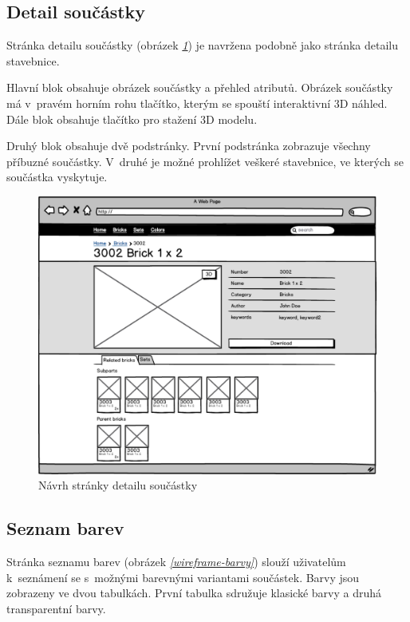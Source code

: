 \subsection{Detail součástky}
Stránka detailu součástky (obrázek \emph{\ref{wireframe-soucastka-detail}}) je navržena podobně jako stránka detailu stavebnice. 

Hlavní blok obsahuje obrázek součástky a přehled atributů. Obrázek součástky má v~pravém horním rohu tlačítko, kterým se spouští interaktivní 3D náhled. Dále blok obsahuje tlačítko pro stažení 3D modelu. 

Druhý blok obsahuje dvě podstránky. První podstránka zobrazuje všechny příbuzné součástky. V~druhé je možné prohlížet veškeré stavebnice, ve kterých se součástka vyskytuje.

\begin{figure}[htbp]
    \centering
    \includegraphics[width=\textwidth,height=\textheight,keepaspectratio]{pdfs/wireframe_brick.pdf}
    \caption{Návrh stránky detailu součástky}\label{wireframe-soucastka-detail}
\end{figure}

\subsection{Seznam barev}
Stránka seznamu barev (obrázek \emph{\ref{wireframe-barvy}}) slouží uživatelům k~seznámení se s~možnými barevnými variantami součástek. Barvy jsou zobrazeny ve dvou tabulkách. První tabulka sdružuje klasické barvy a druhá transparentní barvy. 

